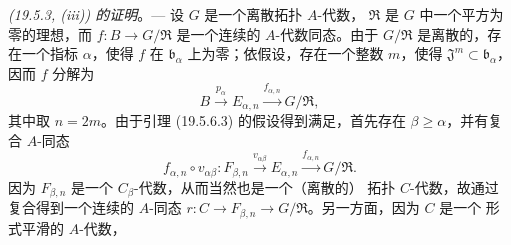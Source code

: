 \begin{env}[19.5.6.8]
\label{0.19.5.6.8-fr}
\emph{(19.5.3, (iii)) 的证明}。--- 设 $G$ 是一个离散拓扑 $A$-代数，
$\mathfrak R$ 是 $G$ 中一个平方为零的理想，而
$f:B\to G/\mathfrak R$ 是一个连续的 $A$-代数同态。由于
$G/\mathfrak R$ 是离散的，存在一个指标 $\alpha$，使得 $f$ 在
$\mathfrak b_\alpha$ 上为零；依假设，存在一个整数 $m$，使得
$\mathfrak J^m\subset\mathfrak b_\alpha$，因而 $f$ 分解为
\[
  B\xrightarrow{p_\alpha}E_{\alpha,n}
  \xrightarrow{f_{\alpha,n}}G/\mathfrak R,
\]
其中取 $n=2m$。由于引理 (19.5.6.3) 的假设得到满足，首先存在
$\beta\geq\alpha$，并有复合 $A$-同态
\begin{equation}
\label{0.19.5.6.9-fr}
  f_{\alpha,n}\circ v_{\alpha\beta}:F_{\beta,n}
  \xrightarrow{v_{\alpha\beta}}E_{\alpha,n}
  \xrightarrow{f_{\alpha,n}}G/\mathfrak R.
  \tag{19.5.6.9}
\end{equation}
因为 $F_{\beta,n}$ 是一个 $C_\beta$-代数，从而当然也是一个（离散的）
拓扑 $C$-代数，故通过复合得到一个连续的 $A$-同态
$r:C\to F_{\beta,n}\to G/\mathfrak R$。另一方面，因为 $C$ 是一个
形式平滑的 $A$-代数，



\end{env}

